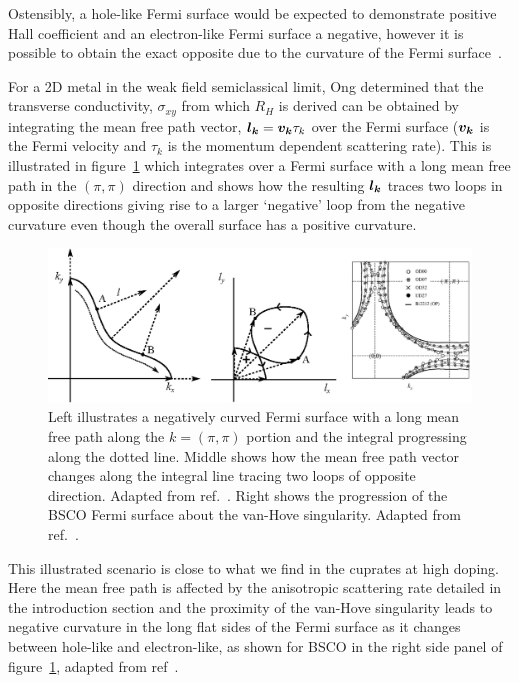 Ostensibly, a hole-like Fermi surface would be expected to demonstrate positive Hall coefficient and an electron-like Fermi surface a negative, however it is possible to obtain the exact opposite due to the curvature of the Fermi surface~\cite{Narduzzo2008}. 

For a 2D metal in the weak field semiclassical limit, Ong determined that the transverse conductivity, $\sigma_{xy}$ from which $R_H$ is derived can be obtained by integrating the mean free path vector, $\boldsymbol{l_k} = \boldsymbol{v_k}\tau_k$ over the Fermi surface ($\boldsymbol{v_k}$ is the Fermi velocity and $\tau_k$ is the momentum dependent scattering rate). This is illustrated in figure~\ref{Fig:Theo:NegativeCurvatureLSCO} which integrates over a Fermi surface with a long mean free path in the $(\pi, \pi)$ direction and shows how the resulting $\boldsymbol{l_k}$ traces two loops in opposite directions giving rise to a larger `negative' loop from the negative curvature even though the overall surface has a positive curvature.
\begin{figure}[htbp]
    \begin{center}
        \includegraphics[scale=0.9]{Chapter-Theory/Figures/NegativeCurvatureLSCO/NegativeCurvatureLSCO}
        \caption{Left illustrates a negatively curved Fermi surface with a long mean free path along the $k = (\pi, \pi)$ portion and the integral progressing along the dotted line. Middle shows how the mean free path vector changes along the integral line tracing two loops of opposite direction. Adapted from ref.~\cite{Narduzzo2008}. Right shows the progression of the \ac{BSCO} Fermi surface about the van-Hove singularity. Adapted from ref.~\cite{Kondo2004}.}
        \label{Fig:Theo:NegativeCurvatureLSCO}
    \end{center}
\end{figure}
This illustrated scenario is close to what we find in the cuprates at high doping. Here the mean free path is affected by the anisotropic scattering rate detailed in the introduction section and the proximity of the van-Hove singularity leads to negative curvature in the long flat sides of the Fermi surface as it changes between hole-like and electron-like, as shown for \ac{BSCO} in the right side panel of figure~\ref{Fig:Theo:NegativeCurvatureLSCO}, adapted from ref~\cite{Kondo2004}.
